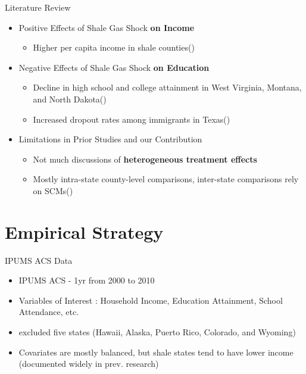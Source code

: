 \documentclass[12pt,  aspectratio=169]{beamer}    %
\begin{document}
\begin{frame}{Literature  Review}
\begin{itemize}
    \item  Positive  Effects  of  Shale  Gas  Shock  \textbf{on  Income}
    \begin{itemize}
        \item  Higher  per  capita  income  in  shale  counties(\cite{weinstein2011economic})
    \end{itemize}
    
    \item  Negative  Effects  of  Shale  Gas  Shock  \textbf{on  Education}
    \begin{itemize}
        \item  Decline  in  high  school  and  college  attainment  in  West  Virginia,  Montana,  and  North  Dakota(\cite{rickman2017shale})
        \item  Increased  dropout  rates  among  immigrants  in  Texas(\cite{carpenter2019texas})
    \end{itemize}
    
    \item  Limitations  in  Prior  Studies  and  our  Contribution
    \begin{itemize}
        \item  Not  much  discussions  of  \textbf{heterogeneous  treatment  effects}
        \item  Mostly  intra-state  county-level  comparisons,  inter-state  comparisons  rely  on  SCMs(\cite{abadie2010synthetic})
    \end{itemize}
\end{itemize}
\end{frame}
\section{Empirical  Strategy}
\begin{frame}{IPUMS  ACS  Data}
    \footnotesize
    \begin{itemize}
        \item  IPUMS  ACS  -  1yr  from  2000  to  2010
        \item  Variables  of  Interest  :  Household  Income,  Education  Attainment,  School  Attendance,  etc.
        \item  excluded  five  states  {\tiny  (Hawaii,  Alaska,  Puerto  Rico,  Colorado,  and  Wyoming)}
        \item  Covariates  are  mostly  balanced,  but  shale  states  tend  to  have  lower  income  (documented  widely  in  prev.  research)
    \end{itemize}

\end{frame}
\end{document}
